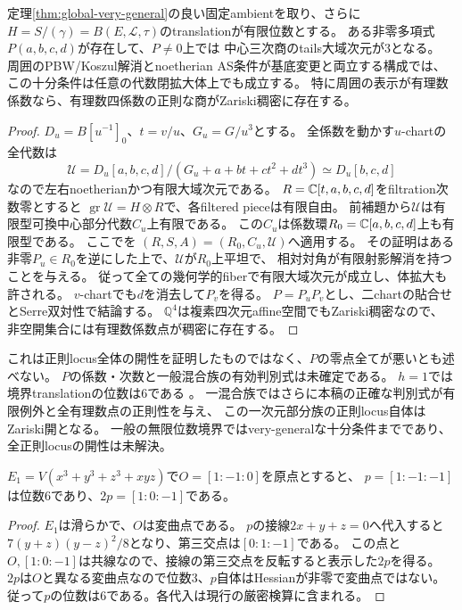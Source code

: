 \begin{theorem}[有限位数境界を持つ固定ambientの開な正則範囲]
\label{thm:global-open}
定理\ref{thm:global-very-general}の良い固定ambientを取り、さらに
$H=S/(\gamma)=B(E,\mathcal L,\tau)$のtranslationが有限位数とする。
ある非零多項式$P(a,b,c,d)$が存在して、$P\ne0$上では
中心三次商のtails大域次元が3となる。
周囲のPBW/Koszul解消とnoetherian AS条件が基底変更と両立する構成では、
この十分条件は任意の代数閉拡大体上でも成立する。
特に周囲の表示が有理数係数なら、有理数四係数の正則な商がZariski稠密に存在する。
\end{theorem}
\begin{proof}
$D_u=B[u^{-1}]_0$、$t=v/u$、$G_u=G/u^3$とする。
全係数を動かす$u$-chartの全代数は
\[
 \mathcal U=D_u[a,b,c,d]/(G_u+a+bt+ct^2+dt^3)
 \simeq D_u[b,c,d]
\]
なので左右noetherianかつ有限大域次元である。
$R=\mathbb C[t,a,b,c,d]$をfiltration次数零とすると
$\operatorname{gr}\mathcal U=H\otimes R$で、各filtered pieceは有限自由。
前補題から$\mathcal U$は有限型可換中心部分代数$C_u$上有限である。
この$C_u$は係数環$R_0=\mathbb C[a,b,c,d]$上も有限型である。
ここで\cite[Proposition~2.1, proof steps (6)--(7)]{RSVBertini}を
$(R,S,A)=(R_0,C_u,\mathcal U)$へ適用する。
その証明はある非零$P_u\in R_0$を逆にした上で、$\mathcal U$が$R_0$上平坦で、
相対対角が有限射影解消を持つことを与える。
従って全ての幾何学的fiberで有限大域次元が成立し、体拡大も許される。
$v$-chartでも$d$を消去して$P_v$を得る。
$P=P_uP_v$とし、二chartの貼合せとSerre双対性で結論する。
$\mathbb Q^4$は複素四次元affine空間でもZariski稠密なので、
非空開集合には有理数係数点が稠密に存在する。
\end{proof}
\begin{remark}
これは正則locus全体の開性を証明したものではなく、$P$の零点全てが悪いとも述べない。
$P$の係数・次数と一般混合族の有効判別式は未確定である。
$h=1$では境界translationの位数は6である
\cite[\S8.2]{WWYSklyanin}。
一混合族ではさらに本稿の正確な判別式が有限例外と全有理数点の正則性を与え、
この一次元部分族の正則locus自体はZariski開となる。
一般の無限位数境界ではvery-generalな十分条件までであり、全正則locusの開性は未解決。
\end{remark}

\begin{lemma}[位数6の具体的な楕円曲線計算]
$E_1=V(x^3+y^3+z^3+xyz)$で$O=[1:-1:0]$を原点とすると、
$p=[1:-1:-1]$は位数6であり、$2p=[1:0:-1]$である。
\end{lemma}
\begin{proof}
$E_1$は滑らかで、$O$は変曲点である。
$p$の接線$2x+y+z=0$へ代入すると
$7(y+z)(y-z)^2/8$となり、第三交点は$[0:1:-1]$である。
この点と$O,[1:0:-1]$は共線なので、接線の第三交点を反転すると表示した$2p$を得る。
$2p$は$O$と異なる変曲点なので位数3、$p$自体はHessianが非零で変曲点ではない。
従って$p$の位数は6である。各代入は現行の厳密検算に含まれる。
\end{proof}
